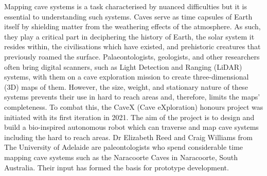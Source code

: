 Mapping cave systems is a task characterised by nuanced difficulties but it is essential to understanding such systems. Caves serve as time capsules of Earth itself by shielding matter from the weathering effects of the atmosphere. As such, they play a critical part in deciphering the history of Earth, the solar system it resides within, the civilisations which have existed, and prehistoric creatures that previously roamed the surface. Palaeontologists, geologists, and other researchers often bring digital scanners, such as Light Detection and Ranging (LiDAR) systems, with them on a cave exploration mission to create three-dimensional (3D) maps of them. However, the size, weight, and stationary nature of these systems prevents their use in hard to reach areas and, therefore, limits the maps' completeness. To combat this, the CaveX (Cave eXploration) honours project was initiated with its first iteration in 2021. The aim of the project is to design and build a bio-inspired autonomous robot which can traverse and map cave systems including the hard to reach areas. Dr Elizabeth Reed and Craig Williams from The University of Adelaide are paleontologists who spend considerable time mapping cave systems such as the Naracoorte Caves in Naracoorte, South Australia. Their input has formed the basis for prototype development.

